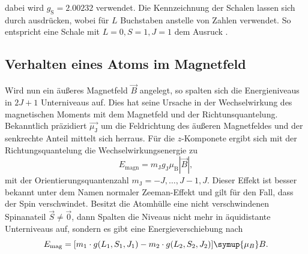 dabei wird $g_\text{S} = \num{2.00232}$ verwendet.
Die Kennzeichnung der Schalen lassen sich durch  ausdrücken, wobei für $L$ Buchstaben anstelle
von Zahlen verwendet. So entspricht eine Schale mit $L=0, S=1, J=1$ dem Ausruck .

\subsection{Verhalten eines Atoms im Magnetfeld}
\label{sec:mag}
Wird nun ein äußeres Magnetfeld $\vec{B}$ angelegt, so spalten sich die Energieniveaus in $2J+1$ Unterniveaus auf.
Dies hat seine Ursache in der Wechselwirkung des magnetischen Moments mit dem Magnetfeld und der Richtunsquantelung.
Bekanntlich präzidiert $\vec{\mu_\text{J}}$ um die Feldrichtung des äußeren Magnetfeldes und der senkrechte Anteil mittelt 
sich herraus. Für die $z$-Komponete ergibt sich mit der Richtungsquantelung die Wechselwirkungsenergie zu
\begin{equation}
  \label{eqn:nzee}
  E_\text{magn} = m_\text{J} g_\text{J} \mu_\text{B} |\vec{B}|,
\end{equation}
mit der Orientierungsquantenzahl $m_\text{J} = -J, \ldots, J-1 ,J$. Dieser Effekt ist besser bekannt unter
dem Namen normaler Zeeman-Effekt und gilt für den Fall, dass der Spin verschwindet.
Besitzt die Atomhülle eine nicht verschwindenen Spinanateil $\vec{S} \neq \vec{0}$, dann Spalten 
die Niveaus nicht mehr in äquidistante Unterniveaus auf, sondern es gibt eine Energieverschiebung nach
\begin{equation}
    \label{eqn:azee}
    E_\text{mag} = [m_1 \cdot g(L_1, S_1, J_1) - m_2 \cdot g(L_2, S_2, J_2)] \symup{\mu_B} B.
\end{equation}

